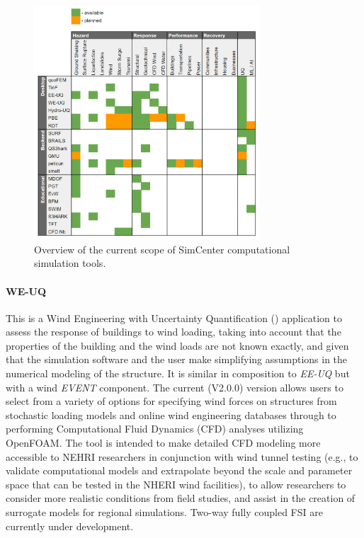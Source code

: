 \begin{figure}[htb]
    \centering
    \includegraphics[width=0.75\textwidth, angle = 0]{Figures/tool_overview.pdf}
    \caption{Overview of the current scope of SimCenter computational simulation tools.}
    \label{fig:intro_tool_overview}
\end{figure}

\paragraph{WE-UQ} This is a Wind Engineering with Uncertainty Quantification () application to assess the response of buildings to wind loading, taking into account that the properties of the building and the wind loads are not known exactly, and given that the simulation software and the user make simplifying assumptions in the numerical modeling of the structure. It is similar in composition to \emph{EE-UQ} but with a wind \emph{EVENT} component.  The current (V2.0.0) version allows users to select from a variety of options for specifying wind forces on structures from stochastic loading models and online wind engineering databases through to performing Computational Fluid Dynamics (CFD) analyses utilizing OpenFOAM. The tool is intended to make detailed CFD modeling more accessible to NEHRI researchers in conjunction with wind tunnel testing (e.g., to validate computational models and extrapolate beyond the scale and parameter space that can be tested in the NHERI wind facilities), to allow researchers to consider more realistic conditions from field studies, and assist in the creation of surrogate models for regional simulations. Two-way fully coupled FSI are currently under development.

